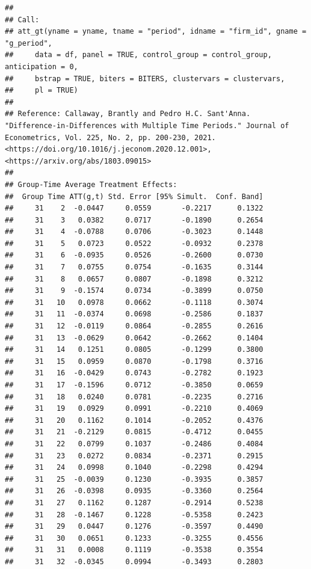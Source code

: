 \documentclass[
]{article}
\begin{document}
\begin{verbatim}
## 
## Call:
## att_gt(yname = yname, tname = "period", idname = "firm_id", gname = "g_period", 
##     data = df, panel = TRUE, control_group = control_group, anticipation = 0, 
##     bstrap = TRUE, biters = BITERS, clustervars = clustervars, 
##     pl = TRUE)
## 
## Reference: Callaway, Brantly and Pedro H.C. Sant'Anna.  "Difference-in-Differences with Multiple Time Periods." Journal of Econometrics, Vol. 225, No. 2, pp. 200-230, 2021. <https://doi.org/10.1016/j.jeconom.2020.12.001>, <https://arxiv.org/abs/1803.09015> 
## 
## Group-Time Average Treatment Effects:
##  Group Time ATT(g,t) Std. Error [95% Simult.  Conf. Band] 
##     31    2  -0.0447     0.0559       -0.2217      0.1322 
##     31    3   0.0382     0.0717       -0.1890      0.2654 
##     31    4  -0.0788     0.0706       -0.3023      0.1448 
##     31    5   0.0723     0.0522       -0.0932      0.2378 
##     31    6  -0.0935     0.0526       -0.2600      0.0730 
##     31    7   0.0755     0.0754       -0.1635      0.3144 
##     31    8   0.0657     0.0807       -0.1898      0.3212 
##     31    9  -0.1574     0.0734       -0.3899      0.0750 
##     31   10   0.0978     0.0662       -0.1118      0.3074 
##     31   11  -0.0374     0.0698       -0.2586      0.1837 
##     31   12  -0.0119     0.0864       -0.2855      0.2616 
##     31   13  -0.0629     0.0642       -0.2662      0.1404 
##     31   14   0.1251     0.0805       -0.1299      0.3800 
##     31   15   0.0959     0.0870       -0.1798      0.3716 
##     31   16  -0.0429     0.0743       -0.2782      0.1923 
##     31   17  -0.1596     0.0712       -0.3850      0.0659 
##     31   18   0.0240     0.0781       -0.2235      0.2716 
##     31   19   0.0929     0.0991       -0.2210      0.4069 
##     31   20   0.1162     0.1014       -0.2052      0.4376 
##     31   21  -0.2129     0.0815       -0.4712      0.0455 
##     31   22   0.0799     0.1037       -0.2486      0.4084 
##     31   23   0.0272     0.0834       -0.2371      0.2915 
##     31   24   0.0998     0.1040       -0.2298      0.4294 
##     31   25  -0.0039     0.1230       -0.3935      0.3857 
##     31   26  -0.0398     0.0935       -0.3360      0.2564 
##     31   27   0.1162     0.1287       -0.2914      0.5238 
##     31   28  -0.1467     0.1228       -0.5358      0.2423 
##     31   29   0.0447     0.1276       -0.3597      0.4490 
##     31   30   0.0651     0.1233       -0.3255      0.4556 
##     31   31   0.0008     0.1119       -0.3538      0.3554 
##     31   32  -0.0345     0.0994       -0.3493      0.2803 

\end{verbatim}
\end{document}
